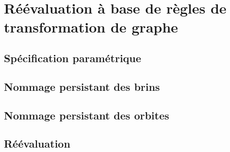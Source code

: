 
\chapter[Réévaluation à base de règles de transformation de graphe]{Réévaluation à base de règles de transformation de graphe}
\label{cha:reevaluation-base-regles}

\section[Spécification paramétrique]{Spécification paramétrique}
\label{sec:reevaluation-specification-parametrique}

\section[Nommage persistant des brins]{Nommage persistant des brins}
\label{sec:reevaluation-nommage-persistant-brins}

\section[Nommage persistant des orbites]{Nommage persistant des orbites}
\label{sec:reevaluation-nommage-persistant-orbites}

\section[Réévaluation]{Réévaluation}
\label{sec:reevaluation-reevaluation}

